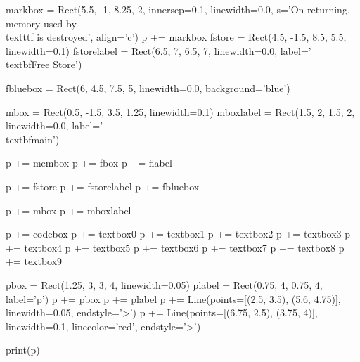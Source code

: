 \begin{python}
markbox = Rect(5.5, -1, 8.25, 2, innersep=0.1, linewidth=0.0, s='On returning, memory used by \\texttt{f} is destroyed', align='c')
p += markbox
fstore = Rect(4.5, -1.5, 8.5, 5.5, linewidth=0.1)
fstorelabel = Rect(6.5, 7, 6.5, 7, linewidth=0.0, label='\\textbf{Free Store}')

fbluebox = Rect(6, 4.5, 7.5, 5, linewidth=0.0, background='blue')

mbox = Rect(0.5, -1.5, 3.5, 1.25, linewidth=0.1)
mboxlabel = Rect(1.5, 2, 1.5, 2, linewidth=0.0, label='\\textbf{main}')

p += membox
p += fbox
p += flabel

p += fstore
p += fstorelabel
p += fbluebox

p += mbox
p += mboxlabel

p += codebox
p += textbox0
p += textbox1
p += textbox2
p += textbox3
p += textbox4
p += textbox5
p += textbox6
p += textbox7
p += textbox8
p += textbox9

pbox = Rect(1.25, 3, 3, 4, linewidth=0.05)
plabel = Rect(0.75, 4, 0.75, 4, label='p')
p += pbox
p += plabel
p += Line(points=[(2.5, 3.5), (5.6, 4.75)], linewidth=0.05, endstyle='>')
p += Line(points=[(6.75, 2.5), (3.75, 4)], linewidth=0.1, linecolor='red', endstyle='>')

print(p)
\end{python}

